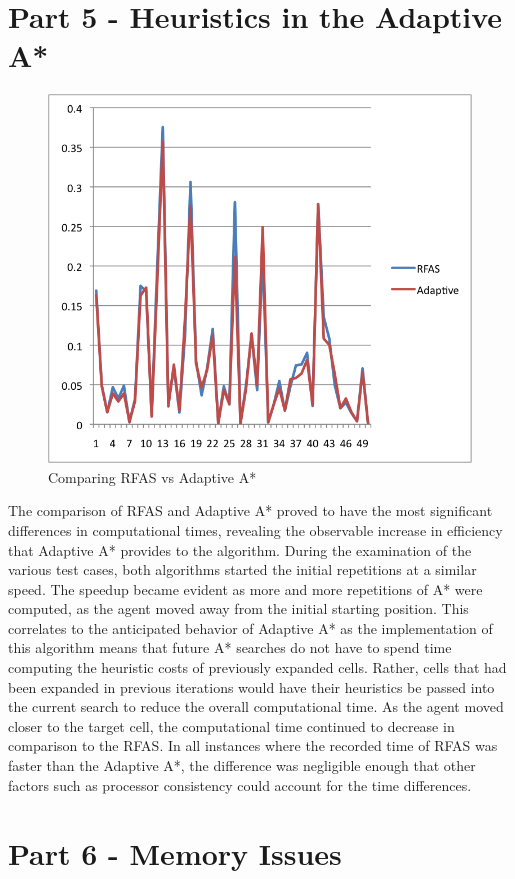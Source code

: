 \documentclass[12pt]{article}
\begin{document}
	\section*{Part 5 - Heuristics in the Adaptive A*}
		\begin{figure}[!htb]
			\centering
			\includegraphics[width=.5\textwidth]{foward_adaptive.png}
			\caption{Comparing RFAS vs Adaptive A*}
		\end{figure}
		The comparison of RFAS and Adaptive A* proved to have the most significant differences in computational times, revealing the observable increase in efficiency that Adaptive A* provides to the algorithm.  During the examination of the various test cases, both algorithms started the initial repetitions at a similar speed.  The speedup became evident as more and more repetitions of A* were computed, as the agent moved away from the initial starting position.  This correlates to the anticipated behavior of Adaptive A* as the implementation of this algorithm means that future A* searches do not have to spend time computing the heuristic costs of previously expanded cells.  Rather, cells that had been expanded in previous iterations would have their heuristics be passed into the current search to reduce the overall computational time.  As the agent moved closer to the target cell, the computational time continued to decrease in comparison to the RFAS.  In all instances where the recorded time of RFAS was faster than the Adaptive A*, the difference was negligible enough that other factors such as processor consistency could account for the time differences.  
	\section*{Part 6 - Memory Issues}
	\onecolumn
\end{document}
